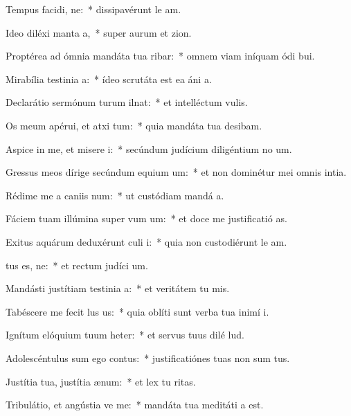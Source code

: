 \item Tempus facidi, ne:~* dissipavérunt le am.
\item Ideo diléxi manta a,~* super aurum et zion.
\item Proptérea ad ómnia mandáta tua ribar:~* omnem viam iníquam ódi bui.
\item Mirabília testinia a:~* ídeo scrutáta est ea áni a.
\item Declarátio sermónum turum ilnat:~* et intelléctum  vulis.
\item Os meum apérui, et atxi tum:~* quia mandáta tua desibam.
\item Aspice in me, et misere i:~* secúndum judícium diligéntium no um.
\item Gressus meos dírige secúndum equium um:~* et non dominétur mei omnis intia.
\item Rédime me a caniis num:~* ut custódiam mandá a.
\item Fáciem tuam illúmina super vum um:~* et doce me justificatió as.
\item Exitus aquárum deduxérunt culi i:~* quia non custodiérunt le am.
\item {}tus es, ne:~* et rectum judíci um.
\item Mandásti justítiam testinia a:~* et veritátem tu mis.
\item Tabéscere me fecit lus us:~* quia oblíti sunt verba tua inimí i.
\item Ignítum elóquium tuum heter:~* et servus tuus dilé lud.
\item Adolescéntulus sum ego  contus:~* justificatiónes tuas non sum tus.
\item Justítia tua, justítia  ænum:~* et lex tu ritas.
\item Tribulátio, et angústia ve me:~* mandáta tua meditáti a est.
